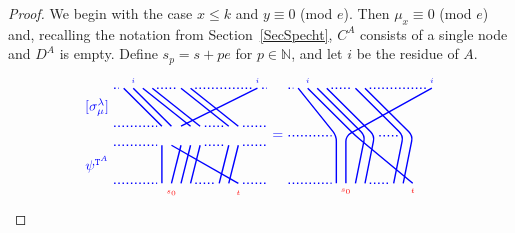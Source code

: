 \documentclass[twoside,11pt,reqno,letter]{amsart}
\numberwithin{equation}{section}
\theoremstyle{definition}  %
\newcommand{\N}{\mathbb{N}}
\newcommand{\0}{{\bar 0}}
\newcommand{\1}{{\bar 1}}
\newcommand{\la}{\lambda}
\newcommand{\si}{\sigma}
\def\T{{\mathtt T}}
\newenvironment{braid}{%
  \begin{tikzpicture}[baseline=6mm,blue,line width=1pt, scale=0.4,
                      draw/.append style={rounded corners},
                      every node/.append style={font=\tiny}]%
  }{\end{tikzpicture}
}
\begin{document}
{\begin{proof}
  We begin with the case $x \leq k$ and $y \equiv 0$ (mod $e$). Then $\mu_x \equiv 0$ (mod $e$) and, recalling the notation from Section~\ref{SecSpecht}, $C^A$ consists of a single node and $D^A$ is empty. Define $s_p = s + pe$ for $p \in \N$, and let $i$ be the residue of $A$.
\begin{equation}\label{eq:Gar_st}
  \begin{braid}\tikzset{scale=0.6,baseline=12mm}
    \draw(0,8)node[left,font=\normalsize]{$[\si^\la_\mu]$};
    \draw(0,2)node[left,font=\normalsize]{$\psi^{\T^A}$};
    \draw(1,10)--(5,6); \draw(5,4)--(5,0);
    \draw(2,10)node[above]{$i$}--(6,6); \draw(6,4)--(13,0); \draw(13,-1)node[color=red]{$t$}; 
    \draw(15,10)node[above]{$i$}--(7,6); \draw(7,4)--(6,0); \draw(6,-1)node[color=red]{$s_0$}; 
    \draw(3,10)--(8,6); \draw(8,4)--(7,0);
    \draw(4,10)--(9,6); \draw(9,4)--(8,0);
    \draw(7,10)--(12,6); \draw(12,4)--(11,0);
    \draw(8,10)--(13,6); \draw(13,4)--(12,0);
    \draw[dotted](0,10)--(0.5,10);
    \draw[dotted](0,6)--(4.5,6);
    \draw[dotted](0,4)--(4.5,4);
    \draw[dotted](0,0)--(4.5,0);
    \draw[dotted](4.5,10)--(6.5,10);
    \draw[dotted](9.5,6)--(11.5,6);
    \draw[dotted](9.5,4)--(11.5,4);
    \draw[dotted](8.5,0)--(10.5,0);
    \draw[dotted](8.5,10)--(14.5,10);
    \draw[dotted](15.5,10)--(16,10);
    \draw[dotted](13.5,6)--(16,6);
    \draw[dotted](13.5,4)--(16,4);
    \draw[dotted](13.5,0)--(16,0);
  \end{braid}
  \begin{braid}\tikzset{scale=0.6,baseline=12mm}
    \draw(0,5)node[font=\normalsize]{$=$};
  \end{braid}
  \begin{braid}\tikzset{scale=0.6,baseline=12mm}
    \draw[dotted](0,10)--(0.5,10);
    \draw[dotted](0,5)--(4.5,5);
    \draw[dotted](0,0)--(4.5,0);

    \draw(1,10)--(5,5)--(5,0);
    \draw(2,10)node[above]{$i$}--(7,5)--(13,0)node[below,color=red]{$t$};
    \draw(3,10)--(8,5)--(7,0);
    \draw(4,10)--(9,5)--(8,0);

    \draw[dotted](4.5,10)--(6.5,10);
    \draw[dotted](9.5,5)--(11.5,5);
    \draw[dotted](8.5,0)--(10.5,0);

    \draw(7,10)--(12,5)--(11,0);
    \draw(8,10)--(13,5)--(12,0);

    \draw[dotted](8.5,10)--(14.5,10);

    \draw(15,10)node[above]{$i$}--(6,5)--(6,0)node[below,color=red]{$s_0$};


\end{braid}
\end{equation}
\end{proof}}
\end{document}
